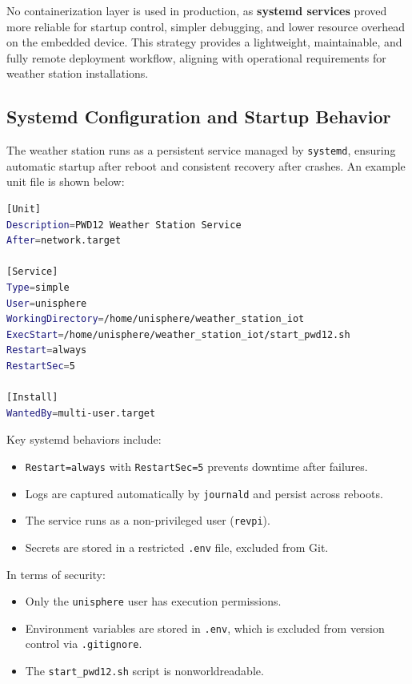 No containerization layer is used in production, as \textbf{systemd services} proved
more reliable for startup control, simpler debugging, and lower resource overhead on
the embedded device. This strategy provides a lightweight, maintainable, and fully
remote deployment workflow, aligning with operational requirements for weather
station installations.

\subsection{Systemd Configuration and Startup Behavior}

The weather station runs as a persistent service managed by \texttt{systemd}, ensuring automatic startup after reboot and consistent recovery after crashes. An example unit file is shown below:

\begin{lstlisting}[language=bash, caption={Systemd unit file for PWD12 weather service}, label={lst:pwd12-service}]
[Unit]
Description=PWD12 Weather Station Service
After=network.target

[Service]
Type=simple
User=unisphere
WorkingDirectory=/home/unisphere/weather_station_iot
ExecStart=/home/unisphere/weather_station_iot/start_pwd12.sh
Restart=always
RestartSec=5

[Install]
WantedBy=multi-user.target
\end{lstlisting}

Key systemd behaviors include:
\begin{itemize}
    \item \texttt{Restart=always} with \texttt{RestartSec=5} prevents downtime after failures.
    \item Logs are captured automatically by \texttt{journald} and persist across reboots.
    \item The service runs as a non-privileged user (\texttt{revpi}).
    \item Secrets are stored in a restricted \texttt{.env} file, excluded from Git.
\end{itemize}

In terms of security:
\begin{itemize}
    \item Only the \texttt{unisphere} user has execution permissions.
    \item Environment variables are stored in \texttt{.env}, which is excluded from version control via \texttt{.gitignore}.
    \item The \texttt{start\_pwd12.sh} script is non\-world\-readable.
\end{itemize}

